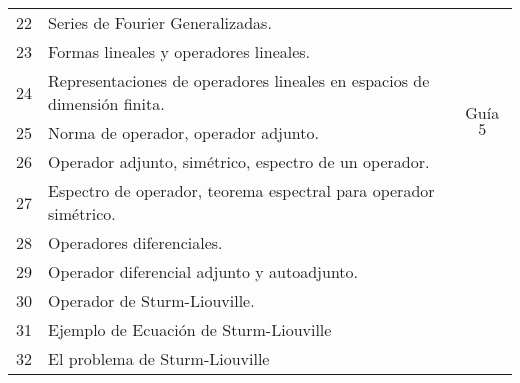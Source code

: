 \begin{table}[H]
\begin{tabular}{||c|p{13cm}||c||}
		\hline
			22 & Series de Fourier Generalizadas. & \multirow{6}{2cm}{Guía $5$} \\
			23 & Formas lineales y operadores lineales. & \\
			24 & Representaciones de operadores lineales en espacios de dimensión finita. & \\
			25 & Norma de operador, operador adjunto. & \\
			26 & Operador adjunto, simétrico, espectro de un operador. & \\
			27 & Espectro de operador, teorema espectral para operador simétrico. & \\
		\hline
			28 & Operadores diferenciales. & \\
			29 & Operador diferencial adjunto y autoadjunto. & \\
			30 & Operador de Sturm-Liouville. & \\
			31 & Ejemplo de Ecuación de Sturm-Liouville & \\
			32 & El problema de Sturm-Liouville & \\
		\hline
		\hline
	\end{tabular}
\end{table}









